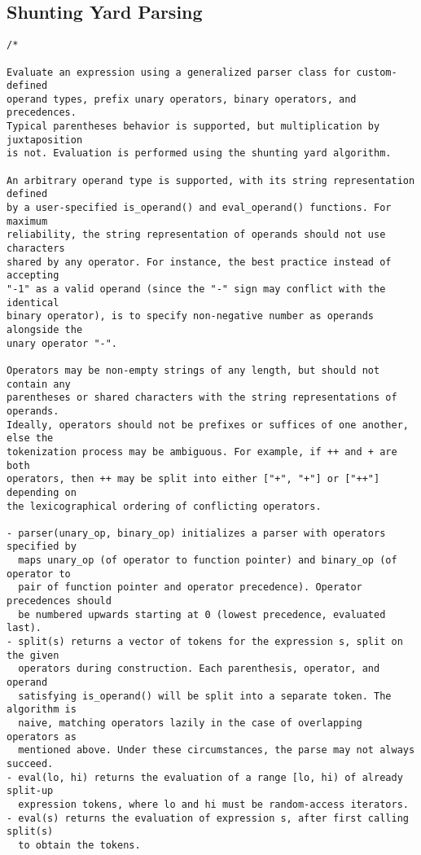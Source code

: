 \subsection{Shunting Yard Parsing}
\begin{lstlisting}
/*

Evaluate an expression using a generalized parser class for custom-defined
operand types, prefix unary operators, binary operators, and precedences.
Typical parentheses behavior is supported, but multiplication by juxtaposition
is not. Evaluation is performed using the shunting yard algorithm.

An arbitrary operand type is supported, with its string representation defined
by a user-specified is_operand() and eval_operand() functions. For maximum
reliability, the string representation of operands should not use characters
shared by any operator. For instance, the best practice instead of accepting
"-1" as a valid operand (since the "-" sign may conflict with the identical
binary operator), is to specify non-negative number as operands alongside the
unary operator "-".

Operators may be non-empty strings of any length, but should not contain any
parentheses or shared characters with the string representations of operands.
Ideally, operators should not be prefixes or suffices of one another, else the
tokenization process may be ambiguous. For example, if ++ and + are both
operators, then ++ may be split into either ["+", "+"] or ["++"] depending on
the lexicographical ordering of conflicting operators.

- parser(unary_op, binary_op) initializes a parser with operators specified by
  maps unary_op (of operator to function pointer) and binary_op (of operator to
  pair of function pointer and operator precedence). Operator precedences should
  be numbered upwards starting at 0 (lowest precedence, evaluated last).
- split(s) returns a vector of tokens for the expression s, split on the given
  operators during construction. Each parenthesis, operator, and operand
  satisfying is_operand() will be split into a separate token. The algorithm is
  naive, matching operators lazily in the case of overlapping operators as
  mentioned above. Under these circumstances, the parse may not always succeed.
- eval(lo, hi) returns the evaluation of a range [lo, hi) of already split-up
  expression tokens, where lo and hi must be random-access iterators.
- eval(s) returns the evaluation of expression s, after first calling split(s)
  to obtain the tokens.


\end{lstlisting}
